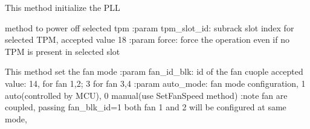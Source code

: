 \documentclass[letterpaper,10pt,english]{sphinxmanual}
\begin{document}
\begin{fulllineitems}
\begin{fulllineitems}
\label{\detokenize{apidocs:subrack_management_board.SubrackMngBoard.PllInitialize}}
\pysigstartsignatures
{}
\pysigstopsignatures
\sphinxAtStartPar
This method initialize the PLL

\end{fulllineitems}


\begin{fulllineitems}
\label{\detokenize{apidocs:subrack_management_board.SubrackMngBoard.PowerOffTPM}}
\pysigstartsignatures
{}
\pysigstopsignatures
\sphinxAtStartPar
method to power off selected tpm
:param  tpm\_slot\_id: subrack slot index for selected TPM, accepted value 1\sphinxhyphen{}8
:param force: force the operation even if no TPM is present in selected slot

\end{fulllineitems}


\begin{fulllineitems}
\label{\detokenize{apidocs:subrack_management_board.SubrackMngBoard.SetFanMode}}
\pysigstartsignatures
{}
\pysigstopsignatures
\sphinxAtStartPar
This method set the fan mode
:param fan\_id\_blk: id of the fan cuople accepted value: 1\sphinxhyphen{}4, for fan 1,2; 3 for fan 3,4
:param auto\_mode: fan mode configuration, 1 auto(controlled by MCU), 0 manual(use SetFanSpeed method)
:note fan are coupled, passing fan\_blk\_id=1 both fan 1 and 2 will be configured at same mode,

\end{fulllineitems}


\end{fulllineitems}
\end{document}
